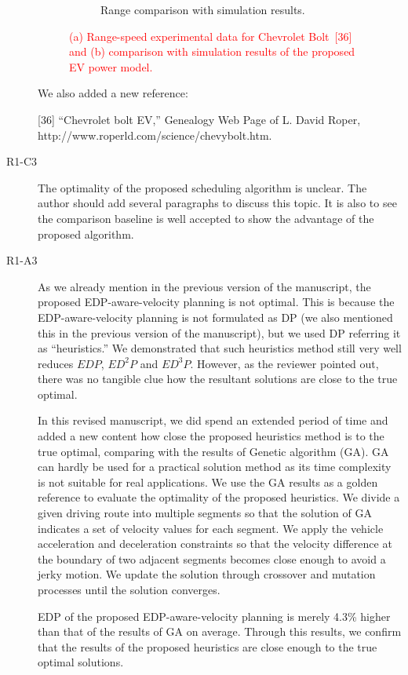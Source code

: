 \documentclass[onecolumn]{IEEEconf}
\begin{document}
\begin{description}
\begin{figure} [h!]
\begin{subfigure}{0.47\textwidth}
	\caption{Range comparison with simulation results.}
	\label{fig:range_speed_valid}
	\end{subfigure}
\caption{\textcolor{red}{(a) Range-speed experimental data for Chevrolet Bolt~[36] and (b) comparison with simulation results of the proposed EV power model.}}
\end{figure}

We also added a new reference:

[36] ``Chevrolet bolt EV,'' Genealogy Web Page of L. David Roper, http://www.roperld.com/science/chevybolt.htm.

\item [R1-C3] The optimality of the proposed scheduling algorithm is unclear. The author should add several paragraphs to discuss this topic. It is also to see the comparison baseline is well accepted to show the advantage of the proposed algorithm.

\item [R1-A3] As we already mention in the previous version of the manuscript, the proposed EDP-aware-velocity planning is not optimal. This is because the EDP-aware-velocity planning is not formulated as DP (we also mentioned this in the previous version of the manuscript), but we used DP referring it as ``heuristics.'' We demonstrated that such heuristics method still very well reduces $EDP$, $ED^2P$ and $ED^3P$. However, as the reviewer pointed out, there was no tangible clue how the resultant solutions are close to the true optimal.

In this revised manuscript, we did spend an extended period of time and added a new content  how close the proposed heuristics method is to the true optimal, comparing with the results of Genetic algorithm (GA). GA can hardly be used for a practical solution method as its time complexity is not suitable for real applications. We use the GA results as a golden reference to evaluate the optimality of the proposed heuristics. We divide a given driving route into multiple segments so that the solution of GA indicates a set of velocity values for each segment. We apply the vehicle acceleration and deceleration constraints so that the velocity difference at the boundary of two adjacent segments becomes close enough to avoid a jerky motion. We update the solution through crossover and mutation processes until the solution converges.

EDP of the proposed EDP-aware-velocity planning is merely 4.3\% higher than that of the results of GA on average. Through this results, we confirm that the results of the proposed heuristics are close enough to the true optimal solutions.


\end{description}
\end{document}
